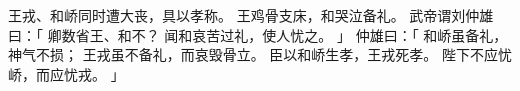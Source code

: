 
\switchcolumn*[\section{}]

王戎、和峤同时遭大丧，具以孝称。
王鸡骨支床，和哭泣备礼。
武帝谓刘仲雄曰：「
    卿数省王、和不？
    闻和哀苦过礼，使人忧之。
」
仲雄曰：「
    和峤虽备礼，神气不损；
    王戎虽不备礼，而哀毁骨立。
    臣以和峤生孝，王戎死孝。
    陛下不应忧峤，而应忧戎。
」

\switchcolumn


